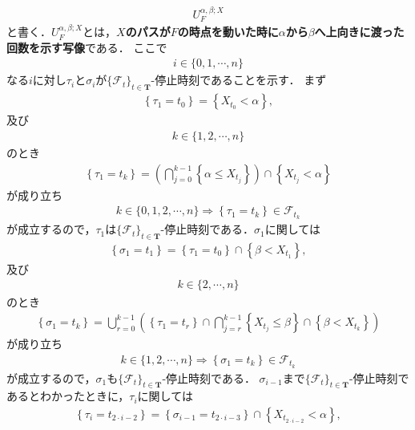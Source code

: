 	\begin{align}
		U_F^{\alpha,\beta;X}
	\end{align}
	と書く．$U_F^{\alpha,\beta;X}$とは，{\bf $X$のパスが$F$の時点を動いた時に$\alpha$から$\beta$へ上向きに渡った回数を示す写像}である．
	ここで
	\begin{align}
		i \in \{0,1,\cdots,n\}
	\end{align}
	なる$i$に対し$\tau_i$と$\sigma_i$が$\{\mathscr{F}_t\}_{t \in \mathbf{T}}$-停止時刻であることを示す．
	まず
	\begin{align}
		\left\{\tau_1 = t_0\right\} = \left\{ X_{t_0} < \alpha \right\},
	\end{align}
	及び
	\begin{align}
		k \in \{1,2,\cdots,n\}
	\end{align}
	のとき
	\begin{align}
		\left\{\tau_1 = t_k\right\} = \left(\bigcap_{j=0}^{k-1} \left\{\alpha \leq X_{t_j}\right\}\right) 
		\cap \left\{ X_{t_j}< \alpha \right\}
	\end{align}
	が成り立ち
	\begin{align}
		k \in \{0,1,2,\cdots,n\} \Longrightarrow \left\{\tau_1 = t_k\right\} \in \mathscr{F}_{t_k}
 	\end{align}
 	が成立するので，$\tau_1$は$\{\mathscr{F}_t\}_{t \in \mathbf{T}}$-停止時刻である．$\sigma_1$に関しては
 	\begin{align}
		\left\{\sigma_1 = t_1\right\} = \left\{\tau_1 = t_0\right\} \cap \left\{\beta < X_{t_1}\right\},
	\end{align}
	及び
	\begin{align}
		k \in \{2,\cdots,n\}
	\end{align}
	のとき
	\begin{align}
		\left\{\sigma_1 = t_k\right\} = 
		\bigcup_{r=0}^{k-1}\left( \left\{\tau_1=t_r\right\} \cap \bigcap_{j=r}^{k-1} \left\{X_{t_j} \leq \beta\right\} \cap \left\{\beta < X_{t_k}\right\} \right)
	\end{align}
	が成り立ち
	\begin{align}
		k \in \{1,2,\cdots,n\} \Longrightarrow \left\{\sigma_1 = t_k\right\} \in \mathscr{F}_{t_k}
 	\end{align}
 	が成立するので，$\sigma_1$も$\{\mathscr{F}_t\}_{t \in \mathbf{T}}$-停止時刻である．
 	$\sigma_{i-1}$まで$\{\mathscr{F}_t\}_{t \in \mathbf{T}}$-停止時刻であるとわかったときに，$\tau_i$に関しては
 	\begin{align}
		\left\{\tau_i = t_{2 \cdot i-2}\right\} = \left\{\sigma_{i-1} = t_{2 \cdot i-3}\right\} \cap \left\{X_{t_{2 \cdot i-2}} < \alpha\right\},
	\end{align}
